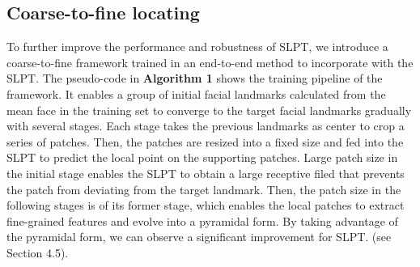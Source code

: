 \documentclass[10pt,twocolumn,letterpaper]{article}
\begin{document}
\subsection{Coarse-to-fine locating}
To further improve the performance and robustness of SLPT, we introduce a coarse-to-fine framework trained in an end-to-end method to incorporate with the SLPT. The pseudo-code in \textbf{Algorithm 1} shows the training pipeline of the framework. It enables a group of initial facial landmarks  calculated from the mean face in the training set to converge to the target facial landmarks gradually with several stages. Each stage takes the previous landmarks as center to crop a series of patches. Then, the patches are resized into a fixed size  and fed into the SLPT to predict the local point on the supporting patches. Large patch size in the initial stage enables the SLPT to obtain a large receptive filed that prevents the patch from deviating from the target landmark. Then, the patch size in the following stages is  of its former stage, which enables the local patches to extract fine-grained features and evolve into a pyramidal form. By taking advantage of the pyramidal form, we can observe a significant improvement for SLPT. (see Section 4.5).
\end{document}
